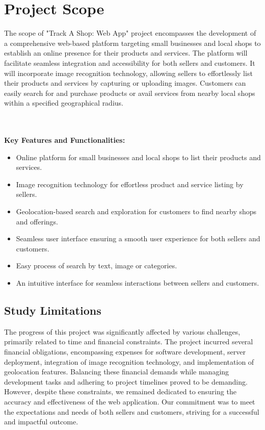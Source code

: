 \vspace{0.5cm}
\section{Project Scope}
The scope of "Track A Shop: Web App" project encompasses the development of a comprehensive web-based platform targeting small businesses and local shops to establish an online presence for their products and services. The platform will facilitate seamless integration and accessibility for both sellers and customers. It will incorporate image recognition technology, allowing sellers to effortlessly list their products and services by capturing or uploading images. Customers can easily search for and purchase products or avail services from nearby local shops within a specified geographical radius.

\textbf{\\\\Key Features and Functionalities:}
\begin{itemize}
	\item Online platform for small businesses and local shops to list their products and services.
	\item Image recognition technology for effortless product and service listing by sellers.
	\item Geolocation-based search and exploration for customers to find nearby shops and offerings.
	\item Seamless user interface ensuring a smooth user experience for both sellers and customers.
	\item Easy process of search by text, image or categories.
	\item An intuitive interface for seamless interactions between sellers and customers.
\end{itemize}

\vspace{0.5cm}
\subsection{Study Limitations}

The progress of this project was significantly affected by various challenges, primarily related to time and financial constraints. The project incurred several financial obligations, encompassing expenses for software development, server deployment, integration of image recognition technology, and implementation of geolocation features. Balancing these financial demands while managing development tasks and adhering to project timelines proved to be demanding. However, despite these constraints, we remained dedicated to ensuring the accuracy and effectiveness of the web application. Our commitment was to meet the expectations and needs of both sellers and customers, striving for a successful and impactful outcome.

